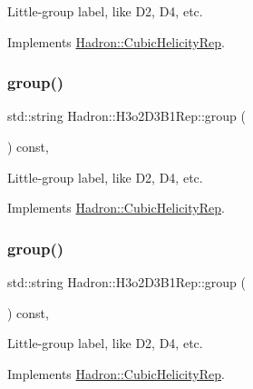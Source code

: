 Little-\/group label, like D2, D4, etc. 

Implements \mbox{\hyperlink{structHadron_1_1CubicHelicityRep_a101a7d76cd8ccdad0f272db44b766113}{Hadron\+::\+Cubic\+Helicity\+Rep}}.

\mbox{\label{structHadron_1_1H3o2D3B1Rep_a0839d8685752d851d9175eb3cfb568d7}} 
\subsubsection{\texorpdfstring{group()}{group()}\hspace{0.1cm}{\footnotesize\ttfamily [3/5]}}
{\footnotesize\ttfamily std\+::string Hadron\+::\+H3o2\+D3\+B1\+Rep\+::group (\begin{DoxyParamCaption}{ }\end{DoxyParamCaption}) const\hspace{0.3cm}{\ttfamily [inline]}, {\ttfamily [virtual]}}

Little-\/group label, like D2, D4, etc. 

Implements \mbox{\hyperlink{structHadron_1_1CubicHelicityRep_a101a7d76cd8ccdad0f272db44b766113}{Hadron\+::\+Cubic\+Helicity\+Rep}}.

\mbox{\label{structHadron_1_1H3o2D3B1Rep_a0839d8685752d851d9175eb3cfb568d7}} 
\subsubsection{\texorpdfstring{group()}{group()}\hspace{0.1cm}{\footnotesize\ttfamily [4/5]}}
{\footnotesize\ttfamily std\+::string Hadron\+::\+H3o2\+D3\+B1\+Rep\+::group (\begin{DoxyParamCaption}{ }\end{DoxyParamCaption}) const\hspace{0.3cm}{\ttfamily [inline]}, {\ttfamily [virtual]}}

Little-\/group label, like D2, D4, etc. 

Implements \mbox{\hyperlink{structHadron_1_1CubicHelicityRep_a101a7d76cd8ccdad0f272db44b766113}{Hadron\+::\+Cubic\+Helicity\+Rep}}.


